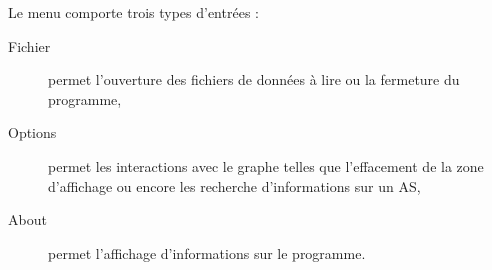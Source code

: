 Le menu comporte trois types d'entr\'ees :
\begin{description}
 \item[Fichier] permet l'ouverture des fichiers de donn\'ees \`a lire ou la fermeture du programme,
 \item[Options] permet les interactions avec le graphe telles que l'effacement de la zone d'affichage ou encore les recherche d'informations sur un AS,
 \item[About] permet l'affichage d'informations sur le programme.
\end{description}


